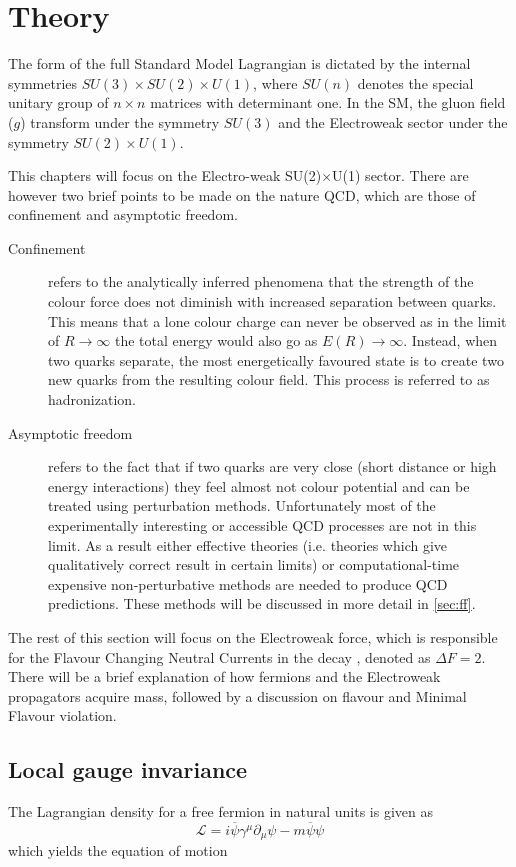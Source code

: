 \section{Theory}
The form of the full Standard Model Lagrangian is dictated by the internal symmetries $SU(3)\times SU(2)\times U(1)$, where $SU(n)$ denotes the special unitary group of $n \times n$ matrices with determinant one. In the SM, the gluon field ($g$) transform under the symmetry $SU(3)$ and the Electroweak sector under the symmetry $SU(2)\times U(1)$.

This chapters will focus on the Electro-weak SU(2)$\times$U(1) sector.  There are however two brief points to be made on the nature QCD, which are those of confinement and asymptotic freedom.

\begin{description}
\item [Confinement] refers to the analytically inferred phenomena that the  strength of the colour force does not diminish with increased separation between quarks. This means that a lone colour charge can never be observed as in the limit of $R\to \infty$ the total energy would also go as $E(R)\to \infty$. Instead, when two quarks separate, the most energetically favoured state is to create two new quarks from the resulting colour field. This process is referred to as hadronization.

\item[Asymptotic freedom] refers to the fact that if two quarks are very close (short distance or high energy interactions) they feel almost not colour potential and can be treated using perturbation methods. Unfortunately most of the experimentally interesting or accessible QCD processes are not in this limit. As a result either effective theories (i.e. theories which give qualitatively correct result in certain limits) or computational-time expensive non-perturbative methods are needed to produce QCD predictions. These methods will be discussed in more detail in \autoref{sec:ff}.
\end{description}
The rest of this section will focus on the Electroweak force, which is responsible for the Flavour Changing Neutral Currents in the decay \Lbpi, denoted as $\Delta F = 2$. There will be a brief explanation of how fermions and the Electroweak propagators acquire mass, followed by a discussion on flavour and Minimal Flavour violation.

\subsection{Local gauge invariance}
\label{sec:gauge}
The Lagrangian density for a free fermion in natural units is given as
\begin{equation}
  \label{eq:L_free}
  \mathcal{L} = i\overline{\psi}\gamma^{\mu}\partial_{\mu}\psi - m\overline{\psi}\psi
\end{equation}
which yields the equation of motion

